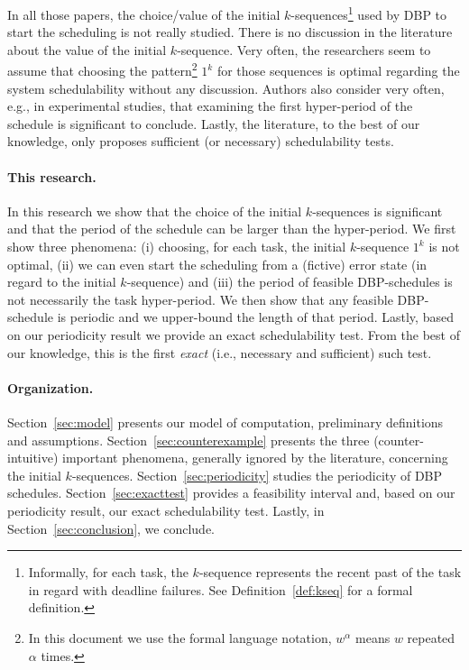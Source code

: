 \documentclass{article}
\begin{document}
In all those papers, the choice/value of the initial $k$-sequences\footnote{Informally, for each task, the $k$-sequence represents the recent past of the task in regard with deadline failures. See Definition~\ref{def:kseq} for a formal definition.} used by DBP to start the scheduling is not really studied. There is no discussion in the literature about the value of the initial $k$-sequence. Very often, the researchers seem to assume that choosing the pattern\footnote{In this document we use the formal language notation, $w^{\alpha}$ means $w$ repeated $\alpha$ times.} $1^k$ for those sequences is optimal regarding the system schedulability without any discussion. Authors also consider very often, e.g., in experimental studies, that examining the first hyper-period of the schedule is significant to conclude. Lastly, the literature, to the best of our knowledge, only proposes sufficient (or necessary) schedulability tests.

\paragraph{This research.} In this research we show that the choice of the initial $k$-sequences is significant and that the period of the schedule can be larger than the hyper-period.
We first show three phenomena: (i) choosing, for each task, the initial $k$-sequence $1^k$ is not optimal, (ii)  we can even start the scheduling from a (fictive) error state (in regard to the initial $k$-sequence) and (iii) the period of feasible DBP-schedules is not necessarily the task hyper-period. We then show that any feasible DBP-schedule is periodic and we upper-bound the length of that period. Lastly, based on our periodicity result we provide an exact schedulability test. From the best of our knowledge, this is the first \emph{exact} (i.e., necessary and sufficient) such test. 

\paragraph{Organization.} Section~\ref{sec:model} presents our model of computation, preliminary definitions and assumptions. Section~\ref{sec:counterexample} presents the three (counter-intuitive) important phenomena, generally ignored by the literature, concerning the initial $k$-sequences. Section~\ref{sec:periodicity} studies the periodicity of DBP schedules. Section~\ref{sec:exacttest} provides a feasibility interval and, based on our periodicity result, our exact schedulability test. Lastly, in Section~\ref{sec:conclusion}, we conclude.
\end{document}
